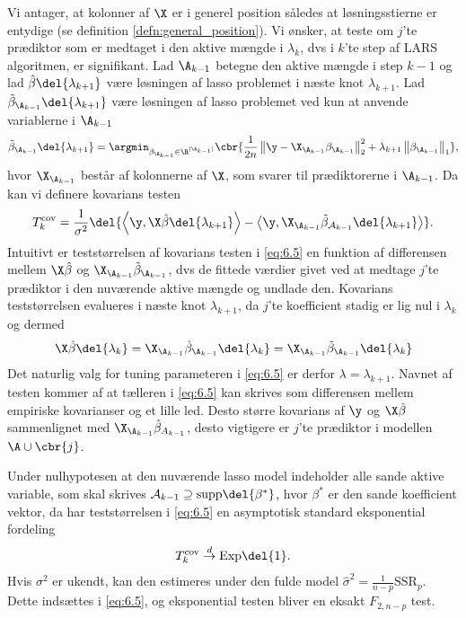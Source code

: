 Vi antager, at kolonner af \(\X\) er i generel position således at løsningsstierne er entydige (se definition \ref{defn:general_position}).
Vi ønsker, at teste om \(j\)'te prædiktor som er medtaget i den aktive mængde i \(\lambda_k\), dvs i \(k\)'te step af LARS algoritmen, er signifikant.
Lad \(\A_{k-1}\) betegne den aktive mængde i step \(k-1\) og lad \(\hat{\beta} \del{\lambda_{k+1}}\) være løsningen af lasso problemet i næste knot \(\lambda_{k+1}\).
Lad \(\tilde{\beta}_{\A_{k-1}} \del{\lambda_{k+1}}\) være løsningen af lasso problemet ved kun at anvende variablerne i \(\A_{k-1}\)
\begin{align*}
\tilde{\beta}_{\A_{k-1}} \del{\lambda_{k+1}} = \argmin_{\beta_{\A_{k-1}} \in \R^{\vert \A_{k-1} \vert}} \cbr{\frac{1}{2n} \left\Vert \y - \X_{\A_{k-1}} \beta_{\A_{k-1}} \right\Vert_2^2 + \lambda_{k+1} \left\Vert \beta_{\A_{k-1}} \right\Vert_1},
\end{align*}
hvor \(\X_{\A_{k-1}}\) består af kolonnerne af \(\X\), som svarer til prædiktorerne i \(\A_{k-1}\).
Da kan vi definere kovarians testen
\begin{align}
T_k^\text{cov} = \frac{1}{\sigma^2} \del{ \left\langle \y, \X \hat{\beta} \del{\lambda_{k+1}} \right\rangle - \left\langle  \y, \X_{\A_{k-1}} \tilde{\beta}_{\mathcal{A}_{k-1}} \del{\lambda_{k+1}} \right\rangle}. \label{eq:6.5}
\end{align}
Intuitivt er teststørrelsen af kovarians testen i \eqref{eq:6.5} en funktion af differensen mellem \(\X \hat{\beta}\) og \(\X_{\A_{k-1}} \tilde{\beta}_{\A_{k-1}}\), dvs de fittede værdier givet ved at medtage \(j\)'te prædiktor i den nuværende aktive mængde og undlade den.
Kovarians teststørrelsen evalueres i næste knot \(\lambda_{k+1}\), da \(j\)'te koefficient stadig er lig nul i \(\lambda_k\) og dermed
\begin{align*}
\X \hat{\beta} \del{\lambda_k} = \X_{\A_{k-1}} \hat{\beta}_{\A_{k-1}} \del{\lambda_k} = \X_{\A_{k-1}} \tilde{\beta}_{\A_{k-1}} \del{\lambda_k}
\end{align*}
Det naturlig valg for tuning parameteren i \eqref{eq:6.5} er derfor \(\lambda= \lambda_{k+1}\).
Navnet af testen kommer af at tælleren i \eqref{eq:6.5} kan skrives som differensen mellem empiriske kovarianser og et lille led.
Desto større kovarians af \(\y\) og \(\X \hat{\beta}\) sammenlignet med \(\X_{\A_{k-1}} \hat{\beta}_{A_{k-1}}\), desto vigtigere er \(j\)'te prædiktor i modellen \(\A \cup \cbr{j}\).

Under nulhypotesen at den nuværende lasso model indeholder alle sande aktive variable, som skal skrives \(\mathcal{A}_{k-1} \supseteq \text{supp} \del{\beta^*}\), hvor \(\beta^*\) er den sande koefficient vektor, da har teststørrelsen i \eqref{eq:6.5} en asymptotisk standard eksponential fordeling
\begin{align*}
T_k^\text{cov} \overset{d}{\rightarrow} \text{Exp}\del{1}.
\end{align*}
Hvis \(\sigma^2\) er ukendt, kan den estimeres under den fulde model \(\hat{\sigma}^2 = \frac{1}{n-p} \text{SSR}_p\). 
Dette indsættes i \eqref{eq:6.5}, og eksponential testen bliver en eksakt \(F_{2,n-p}\) test.

